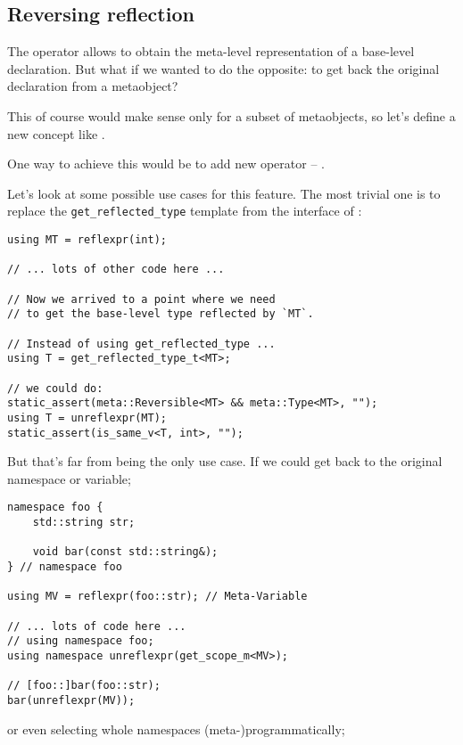 \subsection{Reversing reflection}
\label{fut-reverse-reflection}

The \verb@reflexpr@ operator allows to obtain the meta-level representation
of a base-level declaration. But what if we wanted to do the opposite: to
get back the original declaration from a metaobject?

This of course would make sense only for a subset of metaobjects, so let's
define a new concept like .

One way to achieve this would be to add new operator -- \verb@unreflexpr@.

Let's look at some possible use cases for this feature.
The most trivial one is to replace the \texttt{get\_reflected\_type}
template from the interface of :

\begin{verbatim}
using MT = reflexpr(int);

// ... lots of other code here ...

// Now we arrived to a point where we need
// to get the base-level type reflected by `MT`.

// Instead of using get_reflected_type ...
using T = get_reflected_type_t<MT>;

// we could do:
static_assert(meta::Reversible<MT> && meta::Type<MT>, "");
using T = unreflexpr(MT);
static_assert(is_same_v<T, int>, "");

\end{verbatim}

But that's far from being the only use case. If we could get back to
the original namespace or variable;

\begin{verbatim}
namespace foo {
	std::string str;

	void bar(const std::string&);
} // namespace foo

using MV = reflexpr(foo::str); // Meta-Variable

// ... lots of code here ...
// using namespace foo;
using namespace unreflexpr(get_scope_m<MV>);

// [foo::]bar(foo::str);
bar(unreflexpr(MV));

\end{verbatim}

or even selecting whole namespaces (meta-)programmatically;

